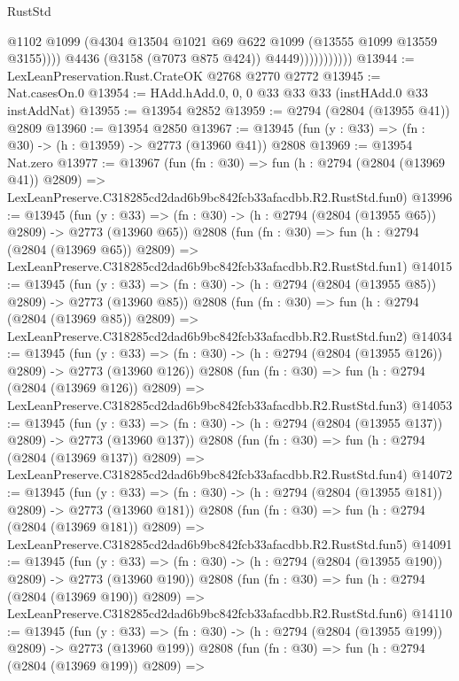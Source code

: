 \begin{lexlean}{RustStd}
\begin{coremodule}
                              @1102
                              @1099
                              (@4304 @13504 @1021 @69 @622 @1099 (@13555 @1099 @13559 @3155))))
                          @4436
                          (@3158 (@7073 @875 @424))
                          @4449)))))))))))
@13944 := LexLeanPreservation.Rust.CrateOK @2768 @2770 @2772
@13945 := Nat.casesOn.{0}
@13954 := HAdd.hAdd.{0, 0, 0} @33 @33 @33 (instHAdd.{0} @33 instAddNat)
@13955 := @13954 @2852
@13959 := @2794 (@2804 (@13955 @41)) @2809
@13960 := @13954 @2850
@13967 := @13945 (fun (y : @33) => (fn : @30) -> (h : @13959) -> @2773 (@13960 @41)) @2808
@13969 := @13954 Nat.zero
@13977 := @13967
    (fun (fn : @30) =>
    fun (h : @2794 (@2804 (@13969 @41)) @2809) =>
    LexLeanPreserve.C318285cd2dad6b9bc842fcb33afacdbb.R2.RustStd.fun0)
@13996 := @13945
    (fun (y : @33) => (fn : @30) -> (h : @2794 (@2804 (@13955 @65)) @2809) -> @2773 (@13960 @65))
    @2808
    (fun (fn : @30) =>
    fun (h : @2794 (@2804 (@13969 @65)) @2809) =>
    LexLeanPreserve.C318285cd2dad6b9bc842fcb33afacdbb.R2.RustStd.fun1)
@14015 := @13945
    (fun (y : @33) => (fn : @30) -> (h : @2794 (@2804 (@13955 @85)) @2809) -> @2773 (@13960 @85))
    @2808
    (fun (fn : @30) =>
    fun (h : @2794 (@2804 (@13969 @85)) @2809) =>
    LexLeanPreserve.C318285cd2dad6b9bc842fcb33afacdbb.R2.RustStd.fun2)
@14034 := @13945
    (fun (y : @33) => (fn : @30) -> (h : @2794 (@2804 (@13955 @126)) @2809) -> @2773 (@13960 @126))
    @2808
    (fun (fn : @30) =>
    fun (h : @2794 (@2804 (@13969 @126)) @2809) =>
    LexLeanPreserve.C318285cd2dad6b9bc842fcb33afacdbb.R2.RustStd.fun3)
@14053 := @13945
    (fun (y : @33) => (fn : @30) -> (h : @2794 (@2804 (@13955 @137)) @2809) -> @2773 (@13960 @137))
    @2808
    (fun (fn : @30) =>
    fun (h : @2794 (@2804 (@13969 @137)) @2809) =>
    LexLeanPreserve.C318285cd2dad6b9bc842fcb33afacdbb.R2.RustStd.fun4)
@14072 := @13945
    (fun (y : @33) => (fn : @30) -> (h : @2794 (@2804 (@13955 @181)) @2809) -> @2773 (@13960 @181))
    @2808
    (fun (fn : @30) =>
    fun (h : @2794 (@2804 (@13969 @181)) @2809) =>
    LexLeanPreserve.C318285cd2dad6b9bc842fcb33afacdbb.R2.RustStd.fun5)
@14091 := @13945
    (fun (y : @33) => (fn : @30) -> (h : @2794 (@2804 (@13955 @190)) @2809) -> @2773 (@13960 @190))
    @2808
    (fun (fn : @30) =>
    fun (h : @2794 (@2804 (@13969 @190)) @2809) =>
    LexLeanPreserve.C318285cd2dad6b9bc842fcb33afacdbb.R2.RustStd.fun6)
@14110 := @13945
    (fun (y : @33) => (fn : @30) -> (h : @2794 (@2804 (@13955 @199)) @2809) -> @2773 (@13960 @199))
    @2808
    (fun (fn : @30) =>
    fun (h : @2794 (@2804 (@13969 @199)) @2809) =>

\end{coremodule}
\end{lexlean}
